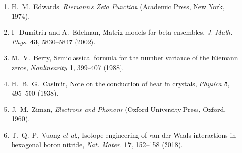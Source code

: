 \documentclass[10pt,twocolumn]{article}
\begin{document}
{\begin{enumerate}
\item H.~M.~Edwards, \textit{Riemann's Zeta Function} (Academic Press, New York, 1974).
\item I.~Dumitriu and A.~Edelman, Matrix models for beta ensembles, \textit{J. Math. Phys.} \textbf{43}, 5830--5847 (2002).
\item M.~V.~Berry, Semiclassical formula for the number variance of the Riemann zeros, \textit{Nonlinearity} \textbf{1}, 399--407 (1988).
\item H.~B.~G.~Casimir, Note on the conduction of heat in crystals, \textit{Physica} \textbf{5}, 495--500 (1938).
\item J.~M.~Ziman, \textit{Electrons and Phonons} (Oxford University Press, Oxford, 1960).
\item T.~Q.~P.~Vuong \textit{et al.}, Isotope engineering of van der Waals interactions in hexagonal boron nitride, \textit{Nat. Mater.} \textbf{17}, 152--158 (2018).
\end{enumerate}}
\end{document}
